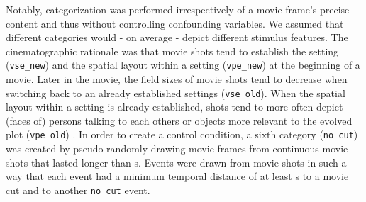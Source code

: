 \documentclass[english]{article}
\begin{document}
Notably, categorization was performed irrespectively of a movie frame's precise
content and thus without controlling confounding variables.
We assumed that different categories would - on average - depict different
stimulus features.
The cinematographic rationale was that movie shots tend to establish the setting
(\texttt{vse\_new}) and the spatial layout within a setting (\texttt{vpe\_new})
at the beginning of a movie.
Later in the movie, the field sizes of movie shots tend to decrease when
switching back to an already established settings (\texttt{vse\_old}).
When the spatial layout within a setting is already established, shots tend to
more often depict (faces of) persons talking to each others or objects more
relevant to the evolved plot (\texttt{vpe\_old}) \citep{brown2012cinematography,
mercado2011filmmakers}.
In order to create a control condition, a sixth category (\texttt{no\_cut}) was
created by pseudo-randomly drawing movie frames from continuous movie shots that
lasted longer than \unit[20]{s}.
Events were drawn from movie shots in such a way that each event had a minimum
temporal distance of at least \unit[10]{s} to a movie cut and to another
\texttt{no\_cut} event.
\end{document}

